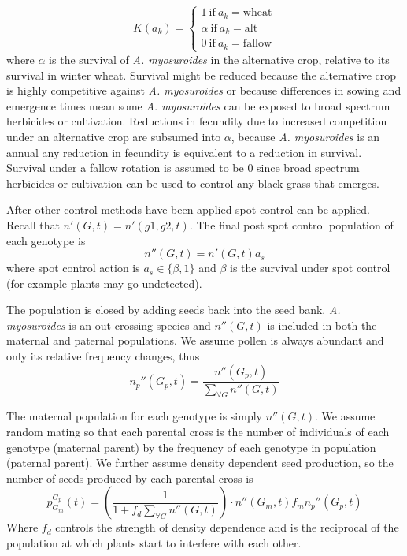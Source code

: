 \documentclass[12pt, a4paper]{article}
\begin{document}
\begin{equation}\label{eq:crop}
	K(a_k) = \begin{cases}
		1~\text{if}~a_k = \text{wheat}\\
		\alpha~\text{if}~a_k = \text{alt}\\
		0~\text{if}~a_k = \text{fallow}		
	\end{cases}
\end{equation}	
where $\alpha$ is the survival of \textit{A. myosuroides} in the alternative crop, relative to its survival in winter wheat. Survival might be reduced because the alternative crop is highly competitive against \textit{A. myosuroides} or because differences in sowing and emergence times mean some \textit{A. myosuroides} can be exposed to broad spectrum herbicides or cultivation. Reductions in fecundity due to increased competition under an alternative crop are subsumed into $\alpha$, because \textit{A. myosuroides} is an annual any reduction in fecundity is equivalent to a reduction in survival. Survival under a fallow rotation is assumed to be 0 since broad spectrum herbicides or cultivation can be used to control any black grass that emerges. 

After other control methods have been applied spot control can be applied. Recall that $n'(G, t) = n'(g1, g2, t)$. The final post spot control population of each genotype is 
\begin{equation}\label{eq:spot_cont}
	n''(G, t) = n'(G, t)a_s
\end{equation}   
where spot control action is $a_s \in \{\beta, 1\}$ and $\beta$ is the survival under spot control (for example plants may go undetected).

The population is closed by adding seeds back into the seed bank. \textit{A. myosuroides} is an out-crossing species and $n''(G, t)$ is included in both the maternal and paternal populations. We assume pollen is always abundant and only its relative frequency changes, thus
\begin{equation}
	n_p''(G_p, t) = \frac{n''(G_p, t)}{\sum_{\forall G} n''(G, t) }
\end{equation}

The maternal population for each genotype is simply $n''(G, t)$. We assume random mating so that each parental cross is the number of individuals of each genotype (maternal parent) by the frequency of each genotype in population (paternal parent). We further assume density dependent seed production, so the number of seeds produced by each parental cross is 
\begin{equation}\label{eq:seed_pro}
	p_{G_m}^{G_p}(t) = \left(\frac{1}{1 + f_d\sum_{\forall G} n''(G, t)}\right) \cdot n''(G_m, t)f_m n_p''(G_p, t)   
\end{equation}
Where $f_d$ controls the strength of density dependence and is the reciprocal of the population at which plants start to interfere with each other. 
\end{document}
